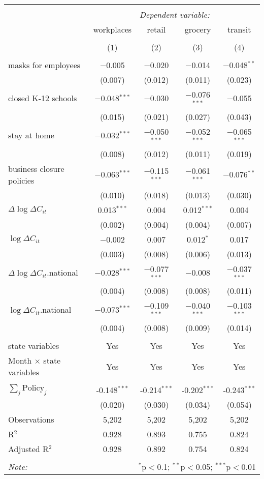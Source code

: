 \begin{tabular}{@{\extracolsep{1pt}}lcccc} 
\\[-1.8ex]\hline 
\hline \\[-1.8ex] 
 & \multicolumn{4}{c}{\textit{Dependent variable:}} \\ 
\cline{2-5} 
 & workplaces & retail & grocery & transit \\ 
\\[-1.8ex] & (1) & (2) & (3) & (4)\\ 
\hline \\[-1.8ex] 
 masks for employees & $-$0.005 & $-$0.020 & $-$0.014 & $-$0.048$^{**}$ \\ 
  & (0.007) & (0.012) & (0.011) & (0.023) \\ 
  closed K-12 schools & $-$0.048$^{***}$ & $-$0.030 & $-$0.076$^{***}$ & $-$0.055 \\ 
  & (0.015) & (0.021) & (0.027) & (0.043) \\ 
  stay at home & $-$0.032$^{***}$ & $-$0.050$^{***}$ & $-$0.052$^{***}$ & $-$0.065$^{***}$ \\ 
  & (0.008) & (0.012) & (0.011) & (0.019) \\ 
  business closure policies & $-$0.063$^{***}$ & $-$0.115$^{***}$ & $-$0.061$^{***}$ & $-$0.076$^{**}$ \\ 
  & (0.010) & (0.018) & (0.013) & (0.030) \\ 
  $\Delta \log \Delta C_{it}$ & 0.013$^{***}$ & 0.004 & 0.012$^{***}$ & 0.004 \\ 
  & (0.002) & (0.004) & (0.004) & (0.007) \\ 
  $\log \Delta C_{it}$ & $-$0.002 & 0.007 & 0.012$^{*}$ & 0.017 \\ 
  & (0.003) & (0.008) & (0.006) & (0.013) \\ 
  $\Delta \log \Delta C_{it}$.national & $-$0.028$^{***}$ & $-$0.077$^{***}$ & $-$0.008 & $-$0.037$^{***}$ \\ 
  & (0.004) & (0.008) & (0.008) & (0.011) \\ 
  $\log \Delta C_{it}$.national & $-$0.073$^{***}$ & $-$0.109$^{***}$ & $-$0.040$^{***}$ & $-$0.103$^{***}$ \\ 
  & (0.004) & (0.008) & (0.009) & (0.014) \\ 
 \hline \\[-1.8ex] 
state variables & Yes & Yes & Yes & Yes \\ 
Month $\times$ state variables & Yes & Yes & Yes & Yes \\ 
\hline \\[-1.8ex] 
$\sum_j \mathrm{Policy}_j$ & -0.148$^{***}$ & -0.214$^{***}$ & -0.202$^{***}$ & -0.243$^{***}$ \\ 
 & (0.020) & (0.030) & (0.034) & (0.054) \\ 
Observations & 5,202 & 5,202 & 5,202 & 5,202 \\ 
R$^{2}$ & 0.928 & 0.893 & 0.755 & 0.824 \\ 
Adjusted R$^{2}$ & 0.928 & 0.892 & 0.754 & 0.824 \\ 
\hline 
\hline \\[-1.8ex] 
\textit{Note:}  & \multicolumn{4}{r}{$^{*}$p$<$0.1; $^{**}$p$<$0.05; $^{***}$p$<$0.01} \\ 
\end{tabular} 
